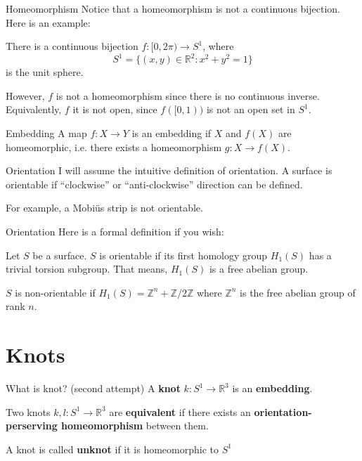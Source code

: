 \documentclass[handout, aspectratio=169]{beamer}
\begin{document}
\begin{frame}{Homeomorphism}
    Notice that a homeomorphism is not a continuous bijection. Here is an example:

    There is a continuous bijection $f:[0, 2\pi)\rightarrow S^1$, where
    $$S^1=\{(x,y)\in\mathbb R^2:x^2+y^2=1\}$$
    is the unit sphere.

    However, $f$ is not a homeomorphism since there is no continuous inverse. Equivalently, $f$ it is not open, since $f([0, 1))$ is not an open set in $S^1$.
\end{frame}

\begin{frame}{Embedding}
    A map $f:X\rightarrow Y$ is an embedding if $X$ and $f(X)$ are homeomorphic, i.e. there exists a homeomorphism $g:X\rightarrow f(X)$.
\end{frame}

\begin{frame}{Orientation}
I will assume the intuitive definition of orientation. A surface is orientable if ``clockwise'' or ``anti-clockwise'' direction can be defined.

For example, a Mobiüs strip is not orientable.
    
\end{frame}
\begin{frame}{Orientation}
Here is a formal definition if you wish:

Let $S$ be a surface. $S$ is orientable if its first homology group $H_1(S)$ has a trivial torsion subgroup. That means, $H_1(S)$ is a free abelian group.

$S$ is non-orientable if $H_1(S)=\mathbb Z^n+\mathbb Z/2\mathbb Z$ where $\mathbb Z^n$ is the free abelian group of rank $n$.
    
\end{frame}

\section{Knots}
\begin{frame}{What is knot? (second attempt)}
A \textbf{knot} $k:S^1\rightarrow \mathbb R^3$ is an \textbf{embedding}.

Two knots $k, l:S^1\rightarrow\mathbb R^3$ are \textbf{equivalent} if there exists an \textbf{orientation-perserving homeomorphism} between them.

A knot is called \textbf{unknot} if it is homeomorphic to $S^1$
\end{frame}
\end{document}
